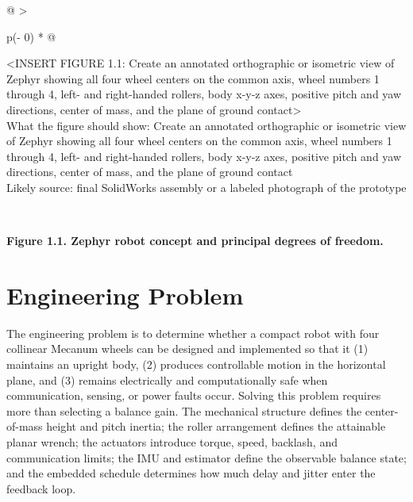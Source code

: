 \begin{longtable}[]{@{}
  >{\raggedright\arraybackslash}p{(\columnwidth - 0\tabcolsep) * }@{}}
\toprule\noalign{}
\begin{minipage}[b]{\linewidth}\raggedright
\textless INSERT FIGURE 1.1: Create an annotated orthographic or
isometric view of Zephyr showing all four wheel centers on the common
axis, wheel numbers 1 through 4, left- and right-handed rollers, body
x-y-z axes, positive pitch and yaw directions, center of mass, and the
plane of ground contact\textgreater{}\\
What the figure should show: Create an annotated orthographic or
isometric view of Zephyr showing all four wheel centers on the common
axis, wheel numbers 1 through 4, left- and right-handed rollers, body
x-y-z axes, positive pitch and yaw directions, center of mass, and the
plane of ground contact\\
Likely source: final SolidWorks assembly or a labeled photograph of the
prototype\strut
\end{minipage} \\
\midrule\noalign{}
\endhead
\bottomrule\noalign{}
\endlastfoot
\end{longtable}

\begin{center}\singlespacing
{}
\textbf{Figure 1.1. Zephyr robot concept and principal degrees of freedom.}
\end{center}

\section{Engineering Problem}\label{engineering-problem}

The engineering problem is to determine whether a compact robot with
four collinear Mecanum wheels can be designed and implemented so that it
(1) maintains an upright body, (2) produces controllable motion in the
horizontal plane, and (3) remains electrically and computationally safe
when communication, sensing, or power faults occur. Solving this problem
requires more than selecting a balance gain. The mechanical structure
defines the center-of-mass height and pitch inertia; the roller
arrangement defines the attainable planar wrench; the actuators
introduce torque, speed, backlash, and communication limits; the IMU and
estimator define the observable balance state; and the embedded schedule
determines how much delay and jitter enter the feedback loop.

